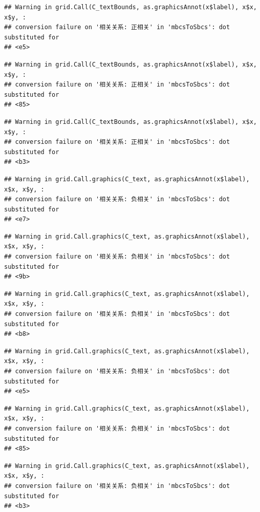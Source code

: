 \documentclass[
]{book}
\begin{document}
\begin{verbatim}
## Warning in grid.Call(C_textBounds, as.graphicsAnnot(x$label), x$x, x$y, :
## conversion failure on '相关关系: 正相关' in 'mbcsToSbcs': dot substituted for
## <e5>
\end{verbatim}

\begin{verbatim}
## Warning in grid.Call(C_textBounds, as.graphicsAnnot(x$label), x$x, x$y, :
## conversion failure on '相关关系: 正相关' in 'mbcsToSbcs': dot substituted for
## <85>
\end{verbatim}

\begin{verbatim}
## Warning in grid.Call(C_textBounds, as.graphicsAnnot(x$label), x$x, x$y, :
## conversion failure on '相关关系: 正相关' in 'mbcsToSbcs': dot substituted for
## <b3>
\end{verbatim}

\begin{verbatim}
## Warning in grid.Call.graphics(C_text, as.graphicsAnnot(x$label), x$x, x$y, :
## conversion failure on '相关关系: 负相关' in 'mbcsToSbcs': dot substituted for
## <e7>
\end{verbatim}

\begin{verbatim}
## Warning in grid.Call.graphics(C_text, as.graphicsAnnot(x$label), x$x, x$y, :
## conversion failure on '相关关系: 负相关' in 'mbcsToSbcs': dot substituted for
## <9b>
\end{verbatim}

\begin{verbatim}
## Warning in grid.Call.graphics(C_text, as.graphicsAnnot(x$label), x$x, x$y, :
## conversion failure on '相关关系: 负相关' in 'mbcsToSbcs': dot substituted for
## <b8>
\end{verbatim}

\begin{verbatim}
## Warning in grid.Call.graphics(C_text, as.graphicsAnnot(x$label), x$x, x$y, :
## conversion failure on '相关关系: 负相关' in 'mbcsToSbcs': dot substituted for
## <e5>
\end{verbatim}

\begin{verbatim}
## Warning in grid.Call.graphics(C_text, as.graphicsAnnot(x$label), x$x, x$y, :
## conversion failure on '相关关系: 负相关' in 'mbcsToSbcs': dot substituted for
## <85>
\end{verbatim}

\begin{verbatim}
## Warning in grid.Call.graphics(C_text, as.graphicsAnnot(x$label), x$x, x$y, :
## conversion failure on '相关关系: 负相关' in 'mbcsToSbcs': dot substituted for
## <b3>
\end{verbatim}
\end{document}
